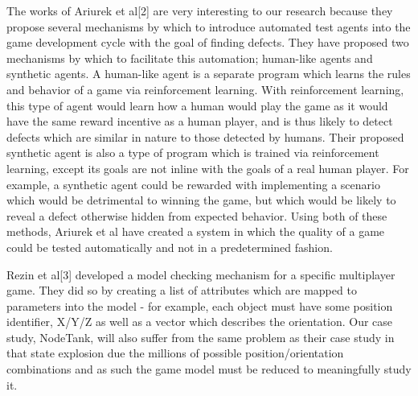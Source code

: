\documentclass[conference]{IEEEtran}
\begin{document}
The works of Ariurek et al[2] are very interesting to our research because they propose several mechanisms by which to introduce automated test agents into the game
development cycle with the goal of finding defects. They have proposed two mechanisms by which to facilitate this automation; human-like agents and synthetic agents. 
A human-like agent is a separate program which learns the rules and behavior of a game via reinforcement learning. With reinforcement learning, this type of agent would 
learn how a human would play the game as it would have the same reward incentive as a human player, and is thus likely to detect defects which are similar in nature to those 
detected by humans. Their proposed synthetic agent is also a type of program which is trained via reinforcement learning, except its goals are not inline with the goals of a 
real human player. For example, a synthetic agent could be rewarded with implementing a scenario which would be detrimental to winning the game, but which would be likely to
reveal a defect otherwise hidden from expected behavior. Using both of these methods, Ariurek et al have created a system in which the quality of a game could be tested automatically 
and not in a predetermined fashion. 

Rezin et al[3] developed a model checking mechanism for a specific multiplayer game. They did so by creating a list of attributes which are mapped to parameters into the model -
 for example, each object must have some position identifier, X/Y/Z as well as a vector which describes the orientation. Our case study, NodeTank, will also suffer from the same 
 problem as their case study in that state explosion due the millions of possible position/orientation combinations and as such the game model must be reduced to meaningfully study it. 
\end{document}
